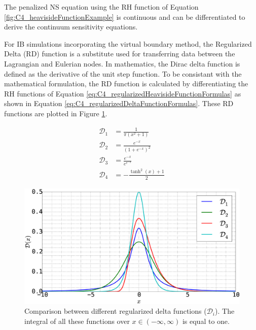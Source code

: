 The penalized NS equation using the RH function of Equation \eqref{fig:C4_heavisideFunctionExample} is continuous and can be differentiated to derive the continuum sensitivity equations.

For IB simulations incorporating the virtual boundary method, the Regularized Delta (RD) function is a substitute used for transferring data between the Lagrangian and Eulerian nodes. In mathematics, the Dirac delta function is defined as the derivative of the unit step function. To be consistant with the mathematical formulation, the RD function is calculated by differentiating the RH functions of Equation \eqref{eq:C4_regularizedHeavisideFunctionFormulas} as shown in Equation \eqref{eq:C4_regularizedDeltaFunctionFormulas}. These RD functions are plotted in Figure \ref{fig:C4_deltaFunctionExample}.

\begin{subequations}\label{eq:C4_regularizedDeltaFunctionFormulas}
\begin{align}
	\mathcal{D}_1 &= \frac{1}{\pi \left(x^{2} + 1\right)} \\
	\mathcal{D}_2 &= \frac{e^{- x}}{\left(1 + e^{- x}\right)^{2}} \\
	\mathcal{D}_3 &= \frac{e^{- x}}{e^{e^{- x}}} \\
	\mathcal{D}_4 &= - \frac{\tanh^{2}{\left (x \right )} + 1}{2}
\end{align}
\end{subequations}

\begin{figure}[H]
	\centering
	\includegraphics[width=12.00cm]{Chapter_4/figure/delta_function_example.eps}
	\caption{Comparison between different regularized delta functions ($\mathcal{D}_i$). The integral of all these functions over $x\in(-\infty, \infty)$ is equal to one.}
	\label{fig:C4_deltaFunctionExample}
\end{figure}

